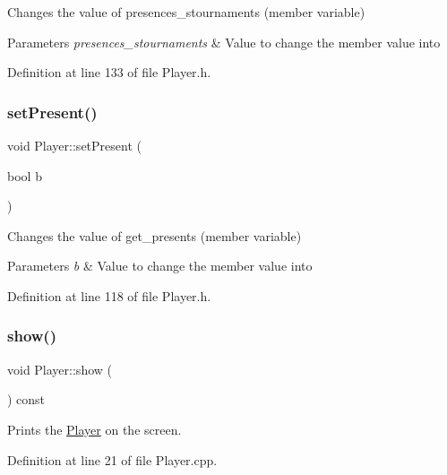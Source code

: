 Changes the value of presences\+\_\+stournaments (member variable) 


\begin{DoxyParams}{Parameters}
{\em presences\+\_\+stournaments} & Value to change the member value into \\
\hline
\end{DoxyParams}


Definition at line 133 of file Player.\+h.

\hypertarget{class_player_af7e72bf68786fafad86906bf4228c467}{}\label{class_player_af7e72bf68786fafad86906bf4228c467} 
\subsubsection{\texorpdfstring{set\+Present()}{setPresent()}}
{\footnotesize\ttfamily void Player\+::set\+Present (\begin{DoxyParamCaption}\item[{bool}]{b }\end{DoxyParamCaption})\hspace{0.3cm}{\ttfamily [inline]}}



Changes the value of get\+\_\+presents (member variable) 


\begin{DoxyParams}{Parameters}
{\em b} & Value to change the member value into \\
\hline
\end{DoxyParams}


Definition at line 118 of file Player.\+h.

\hypertarget{class_player_a623da661c3b627ba79ed595fa8d9a3ea}{}\label{class_player_a623da661c3b627ba79ed595fa8d9a3ea} 
\subsubsection{\texorpdfstring{show()}{show()}}
{\footnotesize\ttfamily void Player\+::show (\begin{DoxyParamCaption}{ }\end{DoxyParamCaption}) const}



Prints the \hyperlink{class_player}{Player} on the screen. 



Definition at line 21 of file Player.\+cpp.



